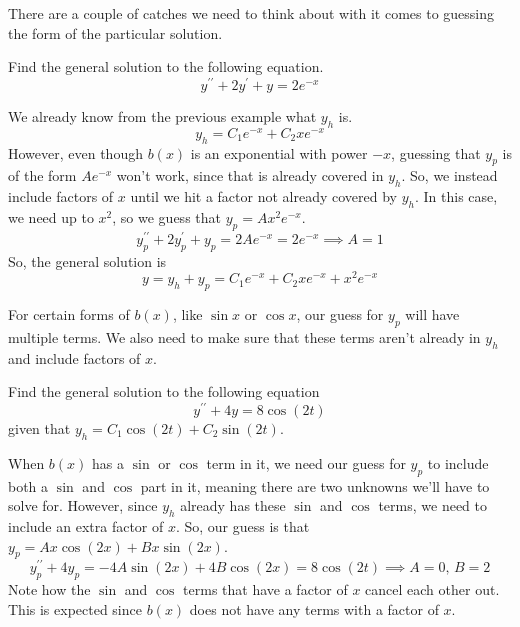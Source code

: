 \noindent
There are a couple of catches we need to think about with it comes to guessing the form of the particular solution.
\begin{example}
	Find the general solution to the following equation.
	\begin{equation*}
		y^{\prime\prime} + 2y^\prime + y = 2e^{-x}
	\end{equation*}
\end{example}
\noindent
We already know from the previous example what $y_h$ is.
\begin{equation*}
	y_h = C_1e^{-x} + C_2xe^{-x}
\end{equation*}
However, even though $b(x)$ is an exponential with power $-x$, guessing that $y_p$ is of the form $Ae^{-x}$ won't work, since that is already covered in $y_h$. So, we instead include factors of $x$ until we hit a factor not already covered by $y_h$. In this case, we need up to $x^2$, so we guess that $y_p = Ax^2e^{-x}$.
\begin{equation*}
	y_p^{\prime\prime} + 2y_p^\prime + y_p = 2Ae^{-x} = 2e^{-x} \implies A = 1
\end{equation*}
So, the general solution is
\begin{equation*}
	y = y_h + y_p = C_1e^{-x} + C_2xe^{-x} + x^2e^{-x}
\end{equation*}

\noindent
For certain forms of $b(x)$, like $\sin{x}$ or $\cos{x}$, our guess for $y_p$ will have multiple terms. We also need to make sure that these terms aren't already in $y_h$ and include factors of $x$.
\begin{example}
	Find the general solution to the following equation
	\begin{equation*}
		y^{\prime\prime} + 4y = 8\cos{(2t)}
	\end{equation*}
	given that $y_h = C_1\cos{(2t)} + C_2\sin{(2t)}$.
\end{example}
\noindent
When $b(x)$ has a $\sin$ or $\cos$ term in it, we need our guess for $y_p$ to include both a $\sin$ and $\cos$ part in it, meaning there are two unknowns we'll have to solve for. However, since $y_h$ already has these $\sin$ and $\cos$ terms, we need to include an extra factor of $x$. So, our guess is that $y_p = Ax\cos{(2x)} + Bx\sin{(2x)}$.
\begin{equation*}
	y_p^{\prime\prime} + 4y_p = -4A\sin{(2x)} + 4B\cos{(2x)} = 8\cos{(2t)} \implies A = 0 \text{, } B = 2
\end{equation*}
Note how the $\sin$ and $\cos$ terms that have a factor of $x$ cancel each other out. This is expected since $b(x)$ does not have any terms with a factor of $x$.\\

